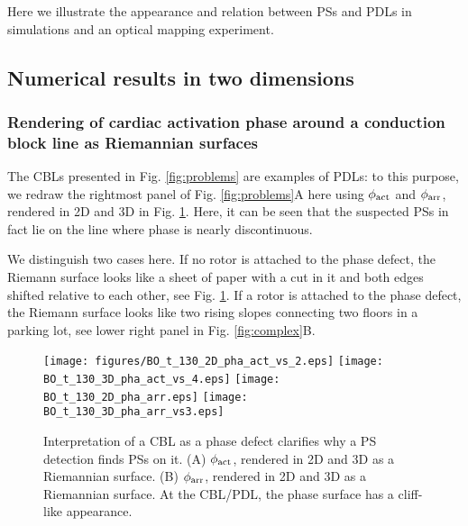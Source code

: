 \documentclass{article}
\newcommand{\phiact}{\ensuremath{\phi_{\rm act}}}
\newcommand{\phiarr}{\ensuremath{\phi_{\rm arr}}}
\begin{document}
Here we illustrate the appearance and relation between PSs and PDLs in  simulations and an optical mapping experiment. 

\subsection{Numerical results in two dimensions}

\subsubsection{Rendering of cardiac activation phase around a conduction block line as Riemannian surfaces}
The CBLs presented in Fig. \ref{fig:problems} are examples of PDLs: to this purpose, we redraw the rightmost panel of Fig. \ref{fig:problems}A here using $\phiact$ and $\phiarr$, rendered in 2D and 3D in Fig. \ref{fig:CBL_Riemann}. Here, it can be seen that the suspected PSs in fact lie on the line where phase is nearly discontinuous. 

We distinguish two cases here. If no rotor is attached to the phase defect, the Riemann surface looks like a sheet of paper with a cut in it and both edges shifted relative to each other, see Fig. \ref{fig:CBL_Riemann}. If a rotor is attached to the phase defect, the Riemann surface looks like two rising slopes connecting two floors in a parking lot, see lower right panel in Fig. \ref{fig:complex}B. 

\begin{figure}
    \centering
{}    \texttt{[image: figures/BO\_t\_130\_2D\_pha\_act\_vs\_2.eps]}
    \texttt{[image: BO\_t\_130\_3D\_pha\_act\_vs\_4.eps]}
    \texttt{[image: BO\_t\_130\_2D\_pha\_arr.eps]}
    \texttt{[image: BO\_t\_130\_3D\_pha\_arr\_vs3.eps]} 
    \caption{Interpretation of a CBL as a phase defect clarifies why a PS detection finds PSs on it. (A) $\phiact$, rendered in 2D and 3D as a Riemannian surface. (B) $\phiarr$, rendered in 2D and 3D as a Riemannian surface. At the CBL/PDL, the phase surface has a cliff-like appearance. }
    \label{fig:CBL_Riemann}
\end{figure}
\end{document}
